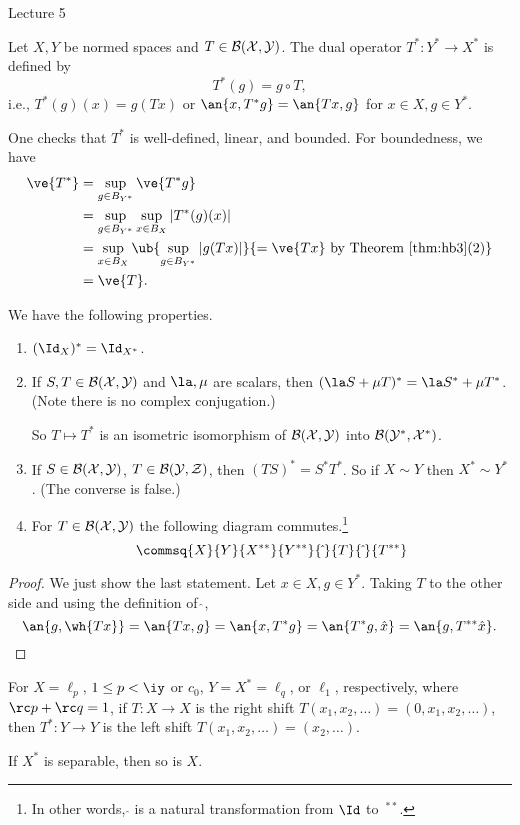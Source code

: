 {\color{blue}Lecture 5}
\begin{df}
Let $X,Y$ be normed spaces and $T\in \cal B(X,Y)$. The dual operator $T^*:Y^*\to X^*$ is defined by
\[
T^*(g)=g\circ T,
\]
i.e., $T^*(g)(x)=g(Tx)$ or $\an{x,T^*g}=\an{Tx,g}$ for $x\in X,g\in Y^*$.
\end{df}
One checks that $T^*$ is well-defined, linear, and bounded. For boundedness, we have
\begin{align*}
\ve{T^*}&=\sup_{g\in B_{Y^*}} \ve{T^*g}\\
&=\sup_{g\in B_{Y^*}} \sup_{x\in B_X}|T^*(g)(x)|\\
&=\sup_{x\in B_X}\ub{\sup_{g\in B_{Y^*}}|g(Tx)|}{=\ve{Tx}\text{ by Theorem~\ref{thm:hb3}(2)}}\\
&=\ve{T}.
\end{align*}
\begin{pr}
We have the following properties.
\begin{enumerate}
\item
$(\Id_X)^*=\Id_{X^*}$.
\item
If $S,T\in \cal B(X,Y)$ and $\la,\mu$ are scalars, then $(\la S+\mu T)^* =\la S^*+\mu T^*$. (Note there is no complex conjugation.)

So $T\mapsto T^*$ is an isometric isomorphism of $\cal B(X,Y)$ into $\cal B(Y^*,X^*)$. 
\item
If $S\in \cal B(X,Y)$, $T\in \cal B(Y,Z)$, then $(TS)^*=S^*T^*$. So if $X\sim Y$ then $X^*\sim Y^*$. (The converse is false.)
\item
For $T\in \cal B(X,Y)$ the following diagram commutes.\footnote{In other words, $\hat{}$ is a natural transformation from $\Id$ to ${\,}^{**}$.}
\[
\commsq{X}{Y}{X^{**}}{Y^{**}}{\hat{\,}}{T}{\hat{\,}}{T^{**}}
\]
\end{enumerate}
\end{pr}
\begin{proof}
We just show the last statement. Let $x\in X,g\in Y^*$. Taking $T$ to the other side and using the definition of $\hat{\,}$,
\[
\an{g, \wh{Tx}}=\an{Tx,g}=\an{x,T^*g}=\an{T^*g,\hat x}=\an{g,T^{**} \hat x}.
\]
\end{proof}
\begin{ex}
For $X=\ell_p$, $1\le p<\iy$ or $c_0$, $Y=X^*=\ell_q$, or $\ell_1$, respectively, where $\rc p +\rc q=1$, if $T:X\to X$ is the right shift $T(x_1,x_2,\ldots)=(0,x_1,x_2,\ldots)$, then $T^*:Y\to Y$ is the left shift $T(x_1,x_2,\ldots)=(x_2,\ldots)$.
\end{ex}
\begin{thm}
If $X^*$ is separable, then so is $X$.
\end{thm}
